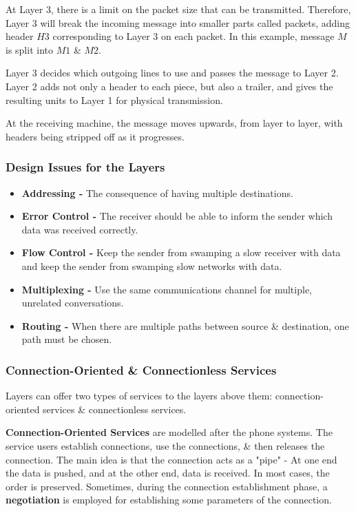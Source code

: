 \documentclass[11pt]{article}
\begin{document}
At Layer 3, there is a limit on the packet size that can be transmitted. 
Therefore, Layer 3 will break the incoming message into smaller parts called packets, adding header $H3$ corresponding to Layer 3 on each 
packet.
In this example, message $M$ is split into $M1$ \& $M2$. 

Layer 3 decides which outgoing lines to use and passes the message to Layer 2. 
Layer 2 adds not only a header to each piece, but also a trailer, and gives the resulting units to Layer 1 for physical 
transmission. 

At the receiving machine, the message moves upwards, from layer to layer, with headers being stripped off as it progresses. 

\subsubsection{Design Issues for the Layers}
\begin{itemize}
    \item   \textbf{Addressing -} The consequence of having multiple destinations. 
    \item   \textbf{Error Control -} The receiver should be able to inform the sender which data was received correctly. 
    \item   \textbf{Flow Control -} Keep the sender from swamping a slow receiver with data and keep the sender from swamping 
            slow networks with data. 
    \item   \textbf{Multiplexing -} Use the same communications channel for multiple, unrelated conversations.
    \item   \textbf{Routing -} When there are multiple paths between source \& destination, one path must be chosen. 
\end{itemize}

\subsubsection{Connection-Oriented \& Connectionless Services} 
Layers can offer two types of services to the layers above them: connection-oriented services \& connectionless services. 

\textbf{Connection-Oriented Services} are modelled after the phone systems. 
The service users establish connections, use the connections, \& then releases the connection. 
The main idea is that the connection acts as a "pipe" - At one end the data is pushed, and at the other end, data is received. 
In most cases, the order is preserved.
Sometimes, during the connection establishment phase, a \textbf{negotiation} is employed for establishing some parameters of 
the connection. 
\end{document}
